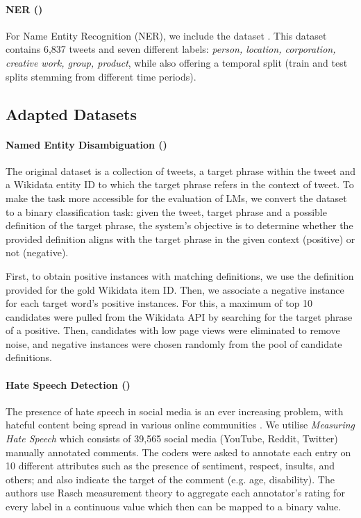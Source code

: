 \paragraph{NER ({\TweetNER})} For Name Entity Recognition (NER), we include the {\TweetNER} dataset \cite{ushio-etal-2022-named}. This dataset contains 6,837 tweets and seven different labels: \textit{person, location, corporation, creative work, group, product}, while also offering a temporal split (train and test splits stemming from different time periods).

\subsection{Adapted Datasets}

\paragraph{Named Entity Disambiguation ({\TweetNERD})} The original {\TweetNERD} dataset \cite{mishra2022tweetnerd} is a collection of tweets, a target phrase within the tweet and a Wikidata entity ID to which the target phrase refers in the context of tweet. To make the task more accessible for the evaluation of \acp{LM}, we convert the dataset to a binary classification task: given the tweet, target phrase and a possible definition of the target phrase, the system's objective is to determine whether the provided definition aligns with the target phrase in the given context (positive) or not (negative).

First, to obtain positive instances with matching definitions, we use the definition provided for the gold Wikidata item ID. Then, we associate a negative instance for each target word's positive instances. For this, a maximum of top 10 candidates were pulled from the Wikidata \ac{API} by searching for the target phrase of a positive. Then, candidates with low page views were eliminated to remove noise, and negative instances were chosen randomly from the pool of candidate definitions.

\paragraph{Hate Speech Detection ({\TweetHate})} The presence of hate speech in social media is an ever increasing problem, with hateful content being spread in various online communities \cite{udanor2019combating, walther2021us}. We utilise \textit{Measuring Hate Speech} \cite{sachdeva-etal-2022-measuring} which consists of 39,565  social media (YouTube, Reddit, Twitter) manually annotated comments. The coders were asked to annotate each entry on 10 different attributes such as the presence of sentiment, respect, insults, and others; and also indicate the target of the comment (e.g. age, disability). The authors use Rasch measurement theory \cite{rasch1960studies} to aggregate each annotator's rating for every label in a continuous value which then can be mapped to a binary value.

